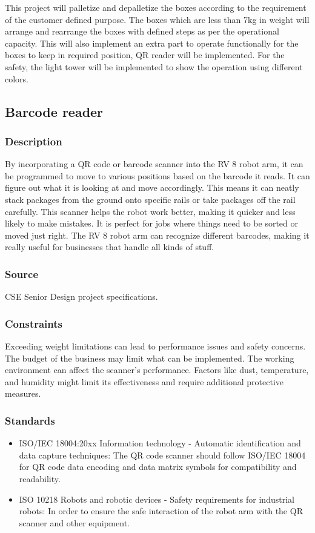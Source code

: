 This project will palletize and depalletize the boxes according to the requirement of the customer defined purpose. The boxes which are less than 7kg in weight will arrange and rearrange the boxes with defined steps as per the operational capacity. This will also implement an extra part to operate functionally for the boxes to keep in required position, QR reader will be implemented. For the safety, the light tower will be implemented to show the operation using different colors.  
\subsection{Barcode reader}
\subsubsection{Description}
By incorporating a QR code or barcode scanner into the RV 8 robot arm, it can be programmed to move to various positions based on the barcode it reads. It can figure out what it is looking at and move accordingly. This means it can neatly stack packages from the ground onto specific rails or take packages off the rail carefully. This scanner helps the robot work better, making it quicker and less likely to make mistakes. It is perfect for jobs where things need to be sorted or moved just right. The RV 8 robot arm can recognize different barcodes, making it really useful for businesses that handle all kinds of stuff.
\subsubsection{Source}
CSE Senior Design project specifications.
\subsubsection{Constraints}
Exceeding weight limitations can lead to performance issues and safety concerns. The budget of the business may limit what can be implemented. The working environment can affect the scanner's performance. Factors like dust, temperature, and humidity might limit its effectiveness and require additional protective measures.
\subsubsection{Standards}
\begin{itemize}
\item ISO/IEC 18004:20xx Information technology - Automatic identification and data capture techniques: The QR code scanner should follow ISO/IEC 18004 for QR code data encoding and data matrix symbols for compatibility and readability.
\item ISO 10218 Robots and robotic devices - Safety requirements for industrial robots: In order to ensure the safe interaction of the robot arm with the QR scanner and other equipment.
\end{itemize}
